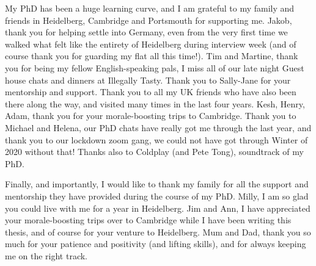 \documentclass[11pt, a4paper, twosided]{book}
\begin{document}
My PhD has been a huge learning curve, and I am grateful to my family and friends in Heidelberg, Cambridge and Portsmouth for supporting me. Jakob, thank you for helping settle into Germany, even from the very first time we walked what felt like the entirety of Heidelberg during interview week (and of course thank you for guarding my flat all this time!). Tim and Martine, thank you for being my fellow English-speaking pals, I miss all of our late night Guest house chats and dinners at Illegally Tasty. Thank you to Sally-Jane for your mentorship and support. Thank you to all my UK friends who have also been there along the way, and visited many times in the last four years. Kesh, Henry, Adam, thank you for your morale-boosting trips to Cambridge. Thank you to Michael and Helena, our PhD chats have really got me through the last year, and thank you to our lockdown zoom gang, we could not have got through Winter of 2020 without that! Thanks also to Coldplay (and Pete Tong), soundtrack of my PhD.

Finally, and importantly, I would like to thank my family for all the support and mentorship they have provided during the course of my PhD. Milly, I am so glad you could live with me for a year in Heidelberg. Jim and Ann, I have appreciated your morale-boosting trips over to Cambridge while I have been writing this thesis, and of course for your venture to Heidelberg. Mum and Dad, thank you so much for your patience and positivity (and lifting skills), and for always keeping me on the right track.
\newpage\null\newpage
\end{document}
